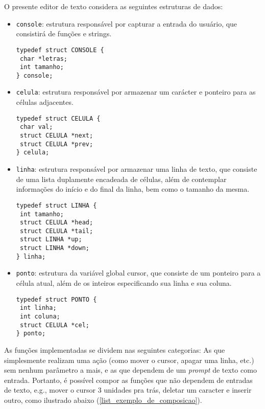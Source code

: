 \documentclass[a4paper, 11pt]{article}
\begin{document}
O presente editor de texto considera as seguintes estruturas de dados:
\begin{itemize}%
\item \texttt{console}: estrutura responsável por capturar a entrada do usuário, que consistirá de funções e strings.

\begin{lstlisting}[name=console,
language={[ansi]C},
frame=trBL,
firstnumber=1]
typedef struct CONSOLE {
 char *letras;
 int tamanho;
} console;
\end{lstlisting}
\item \texttt{celula}: estrutura responsável por armazenar um carácter e ponteiro para as células adjacentes.
\begin{lstlisting}[name=console,
language={[ansi]C},
frame=trBL,
firstnumber=1]
typedef struct CELULA {
 char val;
 struct CELULA *next;
 struct CELULA *prev;
} celula;
\end{lstlisting}
\item \texttt{linha}: estrutura responsável por armazenar uma linha de texto, que consiste de uma lista duplamente encadeada de células, além de contemplar informações do início e do final da linha, bem como o tamanho da mesma.
\begin{lstlisting}[name=console,
language={[ansi]C},
frame=trBL,
firstnumber=1]
typedef struct LINHA {
 int tamanho;
 struct CELULA *head;
 struct CELULA *tail;
 struct LINHA *up;
 struct LINHA *down;
} linha;
\end{lstlisting}
\item \texttt{ponto}: estrutura da variável global cursor, que consiste de um ponteiro para a célula atual, além de os inteiros especificando sua linha e sua coluna. 
\begin{lstlisting}[name=console,
language={[ansi]C},
frame=trBL,
firstnumber=1]
typedef struct PONTO {
 int linha;
 int coluna;
 struct CELULA *cel;
} ponto;
\end{lstlisting}
\end{itemize}

As funções implementadas se dividem nas seguintes categorias: As que simplesmente realizam uma ação (como mover o cursor, apagar uma linha, etc.) sem nenhum parâmetro a mais, e as que dependem de um \textit{prompt} de texto como entrada. Portanto, é possível compor as funções que não dependem de entradas de texto, e.g., mover o cursor 3 unidades pra trás, deletar um caracter e inserir outro, como ilustrado abaixo (\ref{list_exemplo_de_composicao}).
\newpage
\end{document}
